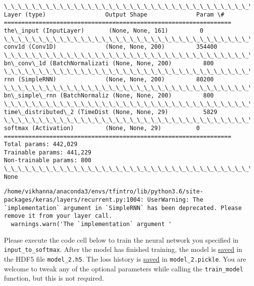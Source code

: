 \documentclass[11pt]{article}
\begin{document}
    \begin{Verbatim}[commandchars=\\\{\}]
\_\_\_\_\_\_\_\_\_\_\_\_\_\_\_\_\_\_\_\_\_\_\_\_\_\_\_\_\_\_\_\_\_\_\_\_\_\_\_\_\_\_\_\_\_\_\_\_\_\_\_\_\_\_\_\_\_\_\_\_\_\_\_\_\_
Layer (type)                 Output Shape              Param \#   
=================================================================
the\_input (InputLayer)       (None, None, 161)         0         
\_\_\_\_\_\_\_\_\_\_\_\_\_\_\_\_\_\_\_\_\_\_\_\_\_\_\_\_\_\_\_\_\_\_\_\_\_\_\_\_\_\_\_\_\_\_\_\_\_\_\_\_\_\_\_\_\_\_\_\_\_\_\_\_\_
conv1d (Conv1D)              (None, None, 200)         354400    
\_\_\_\_\_\_\_\_\_\_\_\_\_\_\_\_\_\_\_\_\_\_\_\_\_\_\_\_\_\_\_\_\_\_\_\_\_\_\_\_\_\_\_\_\_\_\_\_\_\_\_\_\_\_\_\_\_\_\_\_\_\_\_\_\_
bn\_conv\_1d (BatchNormalizati (None, None, 200)         800       
\_\_\_\_\_\_\_\_\_\_\_\_\_\_\_\_\_\_\_\_\_\_\_\_\_\_\_\_\_\_\_\_\_\_\_\_\_\_\_\_\_\_\_\_\_\_\_\_\_\_\_\_\_\_\_\_\_\_\_\_\_\_\_\_\_
rnn (SimpleRNN)              (None, None, 200)         80200     
\_\_\_\_\_\_\_\_\_\_\_\_\_\_\_\_\_\_\_\_\_\_\_\_\_\_\_\_\_\_\_\_\_\_\_\_\_\_\_\_\_\_\_\_\_\_\_\_\_\_\_\_\_\_\_\_\_\_\_\_\_\_\_\_\_
bn\_simple\_rnn (BatchNormaliz (None, None, 200)         800       
\_\_\_\_\_\_\_\_\_\_\_\_\_\_\_\_\_\_\_\_\_\_\_\_\_\_\_\_\_\_\_\_\_\_\_\_\_\_\_\_\_\_\_\_\_\_\_\_\_\_\_\_\_\_\_\_\_\_\_\_\_\_\_\_\_
time\_distributed\_2 (TimeDist (None, None, 29)          5829      
\_\_\_\_\_\_\_\_\_\_\_\_\_\_\_\_\_\_\_\_\_\_\_\_\_\_\_\_\_\_\_\_\_\_\_\_\_\_\_\_\_\_\_\_\_\_\_\_\_\_\_\_\_\_\_\_\_\_\_\_\_\_\_\_\_
softmax (Activation)         (None, None, 29)          0         
=================================================================
Total params: 442,029
Trainable params: 441,229
Non-trainable params: 800
\_\_\_\_\_\_\_\_\_\_\_\_\_\_\_\_\_\_\_\_\_\_\_\_\_\_\_\_\_\_\_\_\_\_\_\_\_\_\_\_\_\_\_\_\_\_\_\_\_\_\_\_\_\_\_\_\_\_\_\_\_\_\_\_\_
None

    \end{Verbatim}

    \begin{Verbatim}[commandchars=\\\{\}]
/home/vikhanna/anaconda3/envs/tfintro/lib/python3.6/site-packages/keras/layers/recurrent.py:1004: UserWarning: The `implementation` argument in `SimpleRNN` has been deprecated. Please remove it from your layer call.
  warnings.warn('The `implementation` argument '

    \end{Verbatim}

    Please execute the code cell below to train the neural network you
specified in \texttt{input\_to\_softmax}. After the model has finished
training, the model is
\href{https://keras.io/getting-started/faq/\#how-can-i-save-a-keras-model}{saved}
in the HDF5 file \texttt{model\_2.h5}. The loss history is
\href{https://wiki.python.org/moin/UsingPickle}{saved} in
\texttt{model\_2.pickle}. You are welcome to tweak any of the optional
parameters while calling the \texttt{train\_model} function, but this is
not required.
\end{document}
